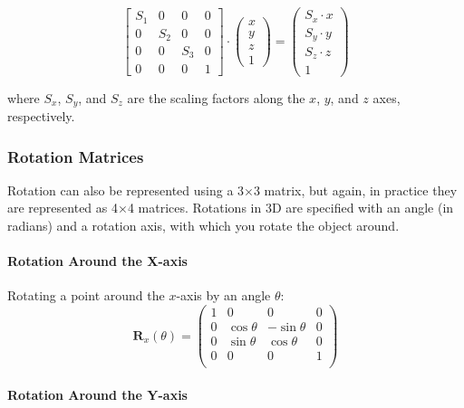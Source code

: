 \documentclass[12pt]{article}
\begin{document}
\[
    \begin{bmatrix}
        {S_1} & 0     & 0     & 0 \\
        0     & {S_2} & 0     & 0 \\
        0     & 0     & {S_3} & 0 \\
        0     & 0     & 0     & 1
    \end{bmatrix} \cdot
    \begin{pmatrix} x \\ y \\ z \\ 1 \end{pmatrix} =
    \begin{pmatrix} {S_x} \cdot x \\ {S_y} \cdot y \\ {S_z} \cdot z \\ 1 \end{pmatrix}
\]

where \( S_x \), \( S_y \), and \( S_z \) are the scaling factors along the \( x \), \( y \), and \( z \) axes, respectively.



\subsubsection{Rotation Matrices}

Rotation can also be represented using a 3$\times$3 matrix, but again, in practice they are represented as 4$\times$4 matrices.
Rotations in 3D are specified with an angle (in radians) and a rotation axis, with which you rotate the object around.


\paragraph{Rotation Around the X-axis}

Rotating a point around the \(x\)-axis by an angle \(\theta\):
\[
    \mathbf{R}_x(\theta) = \begin{pmatrix}
        1 & 0           & 0            & 0 \\
        0 & \cos \theta & -\sin \theta & 0 \\
        0 & \sin \theta & \cos \theta  & 0 \\
        0 & 0           & 0            & 1 \\
    \end{pmatrix}
\]


\paragraph{Rotation Around the Y-axis}
\end{document}
